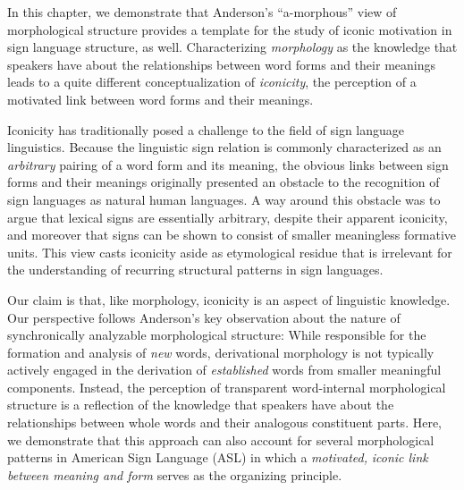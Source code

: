 \documentclass[output=paper,
modfonts
]{LSP/langsci}
\begin{document}
  In this chapter, we demonstrate that Anderson's ``a-morphous'' view of morphological structure provides a template for the study of iconic motivation in sign language structure, as well. Characterizing \textit{morphology} as the knowledge that speakers have about the relationships between word forms and their meanings leads to a quite different conceptualization of \textit{iconicity}, the perception of a motivated link between word forms and their meanings.

  Iconicity has traditionally posed a challenge to the field of sign language linguistics. Because the linguistic sign relation is commonly characterized as an \textit{arbitrary} pairing of a word form and its meaning, the obvious links between sign forms and their meanings originally presented an obstacle to the recognition of sign languages as natural human languages. A way around this obstacle was to argue that lexical signs are essentially arbitrary, despite their apparent iconicity, and moreover that signs can be shown to consist of smaller meaningless formative units. This view casts iconicity aside as etymological residue that is irrelevant for the understanding of recurring structural patterns in sign languages.

  Our claim is that, like morphology, iconicity is an aspect of linguistic knowledge. Our perspective follows Anderson's \citeyearpar{anderson1992} key observation about the nature of synchronically analyzable morphological structure: While responsible for the formation and analysis of \textit{new} words, derivational morphology is not typically actively engaged in the derivation of \textit{established} words from smaller meaningful components. Instead, the perception of transparent word-internal morphological structure is a reflection of the knowledge that speakers have about the relationships between whole words and their analogous constituent parts. Here, we demonstrate that this approach can also account for several morphological patterns in American Sign Language (ASL) in which a \textit{motivated,} \textit{iconic link between meaning and form} serves as the organizing principle.
\end{document}
